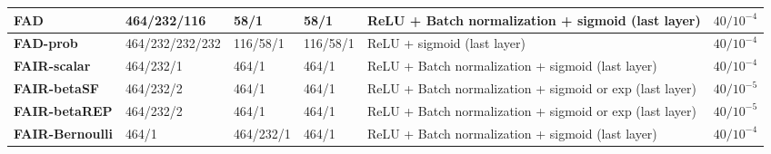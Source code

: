\documentclass[preprint,12pt]{elsarticle}
\begin{document}
\begin{table}
\begin{adjustbox}{max width=\textwidth, totalheight = \textheight-0.1in}
\begin{tabular}{|L|L|L|L|L|L|}
			\midrule
			\textbf{FAD} & 464/232/116 & 58/1 & 58/1 & ReLU + Batch normalization  + sigmoid (last layer) & $40 / 10^{-4}$ \\
			\midrule
			\textbf{FAD-prob} & {464/232/232/232} & 116/58/1 & 116/58/1 & ReLU   + sigmoid (last layer) & $40 / 10^{-4}$ \\
			\midrule
			\textbf{FAIR-scalar} & 464/232/1 & 464/1 & 464/1 & ReLU + Batch normalization  + sigmoid (last layer) & $40 / 10^{-4}$ \\
			\midrule
			\textbf{FAIR-betaSF} & 464/232/2 & 464/1 & 464/1 & ReLU + Batch normalization  + sigmoid or exp (last layer) & $40 / 10^{-5}$ \\
			\midrule
			\textbf{FAIR-betaREP} & 464/232/2 & 464/1 & 464/1 & ReLU + Batch normalization  + sigmoid or exp (last layer) & $40 / 10^{-5}$ \\
			\midrule
			\textbf{FAIR-Bernoulli} & 464/1 & 464/232/1 & 464/1 & ReLU + Batch normalization  + sigmoid (last layer) & $40 / 10^{-4}$ \\
			\bottomrule
	\end{tabular}%
	\end{adjustbox}
	\label{tab:A1}%
\end{table}%
\end{document}
